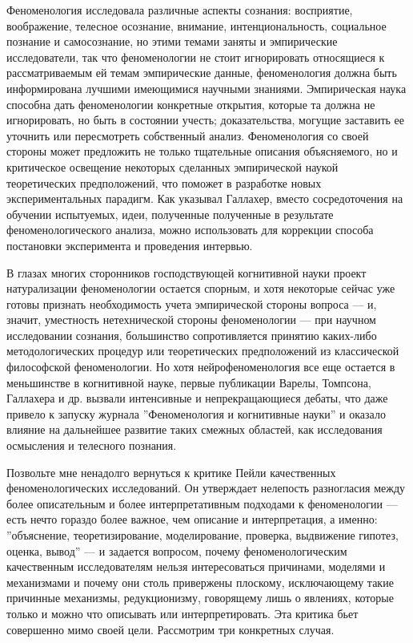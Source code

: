 \documentclass[11pt]{book}
\begin{document}
Феноменология исследовала различные аспекты сознания: восприятие, воображение, телесное осознание, внимание, интенциональность, социальное познание и самосознание, но этими темами заняты и эмпирические исследователи, так что феноменологии не стоит игнорировать относящиеся к рассматриваемым ей темам эмпирические данные, феноменология должна быть информирована лучшими имеющимися научными знаниями. Эмпирическая наука способна дать феноменологии конкретные открытия, которые та должна не игнорировать, но быть в состоянии учесть; доказательства, могущие заставить ее уточнить или пересмотреть собственный анализ. Феноменология со своей стороны может предложить не только тщательные описания объясняемого, но и критическое освещение некоторых сделанных эмпирической наукой теоретических предположений, что поможет в разработке новых экспериментальных парадигм. Как указывал Галлахер, вместо сосредоточения на обучении испытуемых, идеи, полученные полученные в результате феноменологического анализа, можно использовать для коррекции способа постановки эксперимента и проведения интервью.

В глазах многих сторонников господствующей когнитивной науки проект натурализации феноменологии остается спорным, и хотя некоторые сейчас уже готовы признать необходимость учета эмпирической стороны вопроса --- и, значит, уместность нетехнической стороны феноменологии --- при научном исследовании сознания, большинство сопротивляется принятию каких-либо методологических процедур или теоретических предположений из классической философской феноменологии. Но хотя нейрофеноменология все еще остается в меньшинстве в когнитивной науке, первые публикации Варелы, Томпсона, Галлахера и др. вызвали интенсивные и непрекращающиеся дебаты, что даже привело к запуску журнала ''Феноменология и когнитивные науки'' и оказало влияние на дальнейшее развитие таких смежных областей, как исследования осмысления и телесного познания.

Позвольте мне ненадолго вернуться к критике Пейли качественных феноменологических исследований. Он утверждает нелепость разногласия между более описательным и более интерпретативным подходами к феноменологии --- есть нечто гораздо более важное, чем описание и интерпретация, а именно: ''объяснение, теоретизирование, моделирование, проверка, выдвижение гипотез, оценка, вывод'' --- и задается вопросом, почему феноменологическим качественным исследователям нельзя интересоваться причинами, моделями и механизмами и почему они столь привержены плоскому, исключающему такие причинные механизмы, редукционизму, говорящему лишь о явлениях, которые только и можно что описывать или интерпретировать. Эта критика бьет совершенно мимо своей цели. Рассмотрим три конкретных случая.
\end{document}
